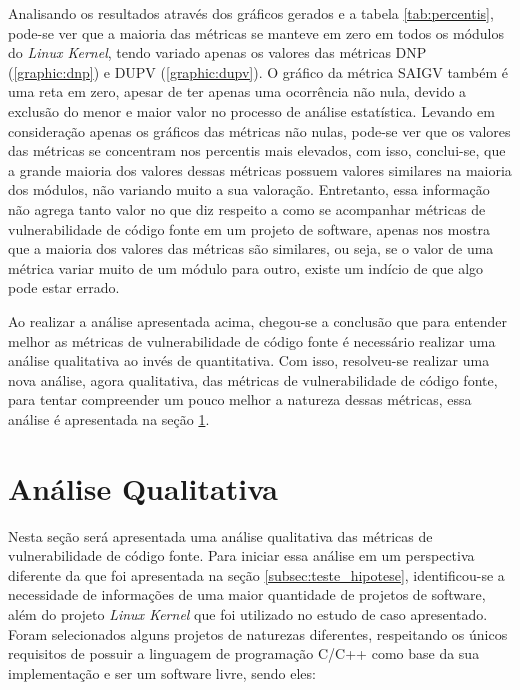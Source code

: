 Analisando os resultados através dos gráficos gerados e a tabela \ref{tab:percentis}, 
pode-se ver que a maioria das métricas se manteve
em zero em todos os módulos do \emph{Linux Kernel}, tendo variado apenas os
valores das métricas DNP (\ref{graphic:dnp}) e DUPV (\ref{graphic:dupv}). O
gráfico da métrica SAIGV também é uma reta em zero, apesar de ter apenas uma ocorrência
não nula, devido a exclusão do menor e maior valor no processo de análise
estatística. Levando em consideração apenas os gráficos das métricas não nulas, 
pode-se ver que os valores das métricas se concentram nos percentis mais elevados, 
com isso, conclui-se, que a grande maioria dos valores dessas métricas possuem valores similares na
maioria dos módulos, não variando muito a sua valoração. Entretanto, essa
informação não agrega tanto valor no que diz respeito a como se acompanhar
métricas de vulnerabilidade de código fonte em um projeto de software, apenas nos mostra que a
maioria dos valores das métricas são similares, ou seja, se o valor de uma
métrica variar muito de um módulo para outro, existe um indício de que algo pode
estar errado.

Ao realizar a análise apresentada acima, chegou-se a conclusão que para entender
melhor as métricas de vulnerabilidade de código fonte é necessário realizar uma
análise qualitativa ao invés de quantitativa. Com isso, resolveu-se realizar uma
nova análise, agora qualitativa, das métricas de vulnerabilidade de código fonte, 
para tentar compreender um pouco melhor a natureza dessas métricas, essa análise 
é apresentada na seção \ref{sec:analise_qualitativa}.

\section{Análise Qualitativa} \label{sec:analise_qualitativa}

Nesta seção será apresentada uma análise qualitativa das métricas de vulnerabilidade 
de código fonte. Para iniciar essa análise em um perspectiva diferente da que foi 
apresentada na seção \ref{subsec:teste_hipotese}, identificou-se a necessidade de informações
de uma maior quantidade de projetos de software, além do projeto \emph{Linux Kernel} que foi
utilizado no estudo de caso apresentado. Foram selecionados alguns projetos de naturezas
diferentes, respeitando os únicos requisitos de possuir a linguagem de programação C/C++ como
base da sua implementação e ser um software livre, sendo eles:

